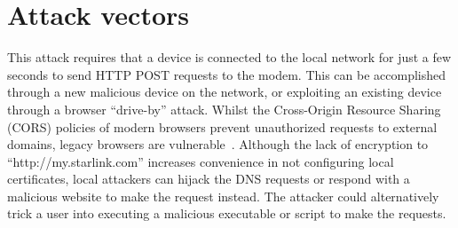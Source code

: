 \section{Attack vectors}\label{sec:attack-vectors}

This attack requires that a device is connected to the local network for just a few seconds to send HTTP POST requests to the modem.
This can be accomplished through a new malicious device on the network, or exploiting an existing device through a browser ``drive-by'' attack.
Whilst the Cross-Origin Resource Sharing (CORS) policies of modern browsers prevent unauthorized requests to external domains, legacy browsers are vulnerable~\cite{cors}.
Although the lack of encryption to ``http://my.starlink.com'' increases convenience in not configuring local certificates, local attackers can hijack the DNS requests or respond with a malicious website to make the request instead.
The attacker could alternatively trick a user into executing a malicious executable or script to make the requests.
